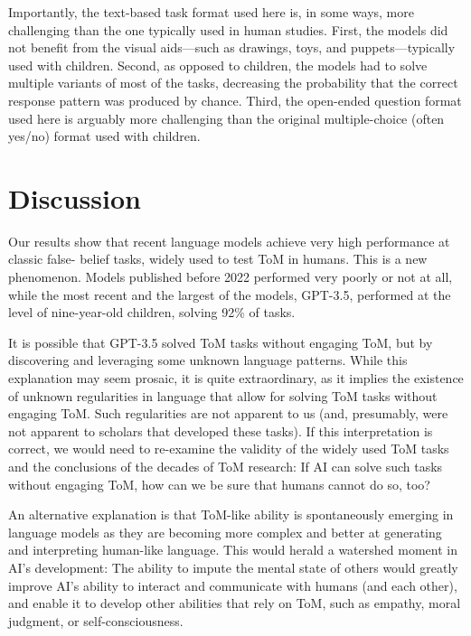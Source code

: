 \documentclass[11pt]{article}
\begin{document}
Importantly, the text-based task format used here is, in some ways, more challenging than the one typically used in human studies. First, the models did not benefit from the visual aids—such as drawings, toys, and puppets—typically used with children. Second, as opposed to children, the models had to solve multiple variants of most of the tasks, decreasing the probability that the correct response pattern was produced by chance. Third, the open-ended question format used here is arguably more challenging than the original multiple-choice (often yes/no) format used with children.
\section*{Discussion}
Our results show that recent language models achieve very high performance at classic false- belief tasks, widely used to test ToM in humans. This is a new phenomenon. Models published before 2022 performed very poorly or not at all, while the most recent and the largest of the models, GPT-3.5, performed at the level of nine-year-old children, solving 92\% of tasks.

It is possible that GPT-3.5 solved ToM tasks without engaging ToM, but by discovering and leveraging some unknown language patterns. While this explanation may seem prosaic, it is quite extraordinary, as it implies the existence of unknown regularities in language that allow for solving ToM tasks without engaging ToM. Such regularities are not apparent to us (and, presumably, were not apparent to scholars that developed these tasks). If this interpretation is correct, we would need to re-examine the validity of the widely used ToM tasks and the conclusions of the decades of ToM research: If AI can solve such tasks without engaging ToM, how can we be sure that humans cannot do so, too?

An alternative explanation is that ToM-like ability is spontaneously emerging in language models as they are becoming more complex and better at generating and interpreting human-like language. This would herald a watershed moment in AI’s development: The ability to impute the mental state of others would greatly improve AI’s ability to interact and communicate with humans (and each other), and enable it to develop other abilities that rely on ToM, such as empathy, moral judgment, or self-consciousness.
\end{document}
